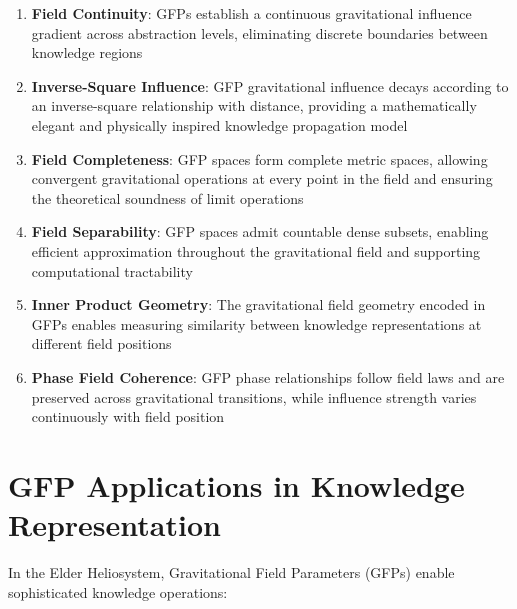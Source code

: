 \begin{enumerate}
    \item \textbf{Field Continuity}: GFPs establish a continuous gravitational influence gradient across abstraction levels, eliminating discrete boundaries between knowledge regions
    
    \item \textbf{Inverse-Square Influence}: GFP gravitational influence decays according to an inverse-square relationship with distance, providing a mathematically elegant and physically inspired knowledge propagation model
    
    \item \textbf{Field Completeness}: GFP spaces form complete metric spaces, allowing convergent gravitational operations at every point in the field and ensuring the theoretical soundness of limit operations
    
    \item \textbf{Field Separability}: GFP spaces admit countable dense subsets, enabling efficient approximation throughout the gravitational field and supporting computational tractability
    
    \item \textbf{Inner Product Geometry}: The gravitational field geometry encoded in GFPs enables measuring similarity between knowledge representations at different field positions
    
    \item \textbf{Phase Field Coherence}: GFP phase relationships follow field laws and are preserved across gravitational transitions, while influence strength varies continuously with field position
\end{enumerate}

\section{GFP Applications in Knowledge Representation}

In the Elder Heliosystem, Gravitational Field Parameters (GFPs) enable sophisticated knowledge operations:

